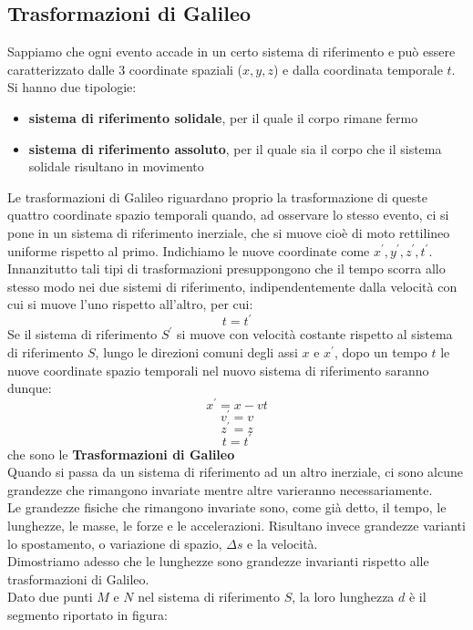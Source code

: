 \documentclass[a4paper,12pt, oneside]{book}
\begin{document}
\subsection{Trasformazioni di Galileo}
Sappiamo che ogni evento accade in un certo sistema di riferimento e può essere caratterizzato dalle 3 coordinate spaziali ($x,y,z$) e dalla coordinata temporale $t$. Si hanno due tipologie:
\begin{itemize}
	\item \textbf{sistema di riferimento solidale}, per il quale il corpo rimane fermo
	\item \textbf{sistema di riferimento assoluto}, per il quale sia il corpo che il sistema solidale risultano in movimento
\end{itemize}
Le trasformazioni di Galileo riguardano proprio la trasformazione di queste quattro coordinate spazio temporali quando, ad osservare lo stesso evento, ci si pone in un sistema di riferimento inerziale, che si muove cioè di moto rettilineo uniforme rispetto al primo. Indichiamo le nuove coordinate come $x^{'},y^{'},z^{'},t^{'}$. Innanzitutto tali tipi di trasformazioni presuppongono che il tempo scorra allo stesso modo nei due sistemi di riferimento, indipendentemente dalla velocità con cui si muove l’uno rispetto all’altro, per cui:
$$t=t^{'}$$
Se il sistema di riferimento $S^{'}$ si muove con velocità costante rispetto al sistema di riferimento $S$, lungo le direzioni comuni degli assi $x$ e $x^{'}$, dopo un tempo $t$ le nuove coordinate spazio temporali nel nuovo sistema di riferimento saranno dunque:
$$x^{'}=x-vt$$
$$v^{'}=v$$
$$z^{'}=z$$
$$t=t^{'}$$
che sono le \textbf{Trasformazioni di Galileo}\\
Quando si passa da un sistema di riferimento ad un altro inerziale, ci sono alcune grandezze che rimangono invariate mentre altre varieranno necessariamente.\\
Le grandezze fisiche che rimangono invariate sono, come già detto, il tempo, le lunghezze, le masse, le forze e le accelerazioni.
Risultano invece grandezze varianti lo spostamento, o variazione di spazio, $\Delta s$ e la velocità.\\
Dimostriamo adesso che le lunghezze sono grandezze invarianti rispetto alle trasformazioni di Galileo.
\\
Dato due punti $M$ e $N$ nel sistema di riferimento $S$, la loro lunghezza $d$ è il segmento riportato in figura:
\end{document}
